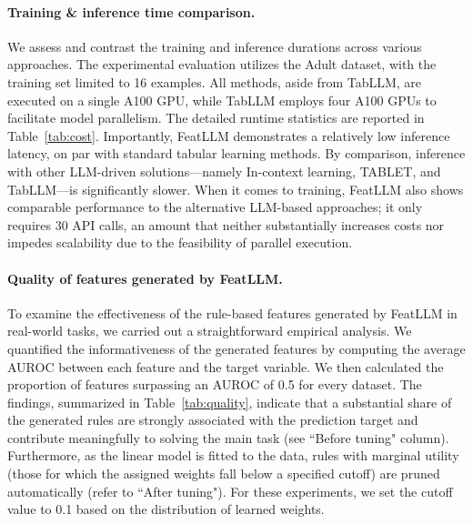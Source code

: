 \vspace*{-0.12in}
\paragraph{Training \& inference time comparison.} We assess and contrast the training and inference durations across various approaches. The experimental evaluation utilizes the Adult dataset, with the training set limited to 16 examples. All methods, aside from TabLLM, are executed on a single A100 GPU, while TabLLM employs four A100 GPUs to facilitate model parallelism. The detailed runtime statistics are reported in Table~\ref{tab:cost}. Importantly, \textsf{FeatLLM} demonstrates a relatively low inference latency, on par with standard tabular learning methods. By comparison, inference with other LLM-driven solutions—namely In-context learning, TABLET, and TabLLM—is significantly slower. When it comes to training, \textsf{FeatLLM} also shows comparable performance to the alternative LLM-based approaches; it only requires 30 API calls, an amount that neither substantially increases costs nor impedes scalability due to the feasibility of parallel execution.

\vspace*{-0.12in}
\paragraph{Quality of features generated by \textsf{FeatLLM}.}
To examine the effectiveness of the rule-based features generated by \textsf{FeatLLM} in real-world tasks, we carried out a straightforward empirical analysis. We quantified the informativeness of the generated features by computing the average AUROC between each feature and the target variable. We then calculated the proportion of features surpassing an AUROC of 0.5 for every dataset. The findings, summarized in Table~\ref{tab:quality}, indicate that a substantial share of the generated rules are strongly associated with the prediction target and contribute meaningfully to solving the main task (see ``Before tuning" column). Furthermore, as the linear model is fitted to the data, rules with marginal utility (those for which the assigned weights fall below a specified cutoff) are pruned automatically (refer to ``After tuning"). For these experiments, we set the cutoff value to 0.1 based on the distribution of learned weights.

\vspace*{-0.12in}
